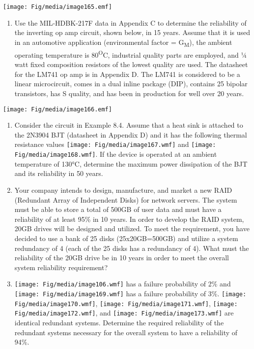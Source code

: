 \texttt{[image: Fig/media/image165.emf]}

\begin{enumerate}
\def\labelenumi{\arabic{enumi}.}
\setcounter{enumi}{7}
\item
  Use the MIL-HDBK-217F data in Appendix C to determine the reliability
  of the inverting op amp circuit, shown below, in 15 years. Assume that
  it is used in an automotive application (environmental factor =
  G\textsubscript{M}), the ambient operating temperature is
  80\textsuperscript{O}C, industrial quality parts are employed, and ¼
  watt fixed composition resistors of the lowest quality are used. The
  datasheet for the LM741 op amp is in Appendix D. The LM741 is
  considered to be a linear microcircuit, comes in a dual inline package
  (DIP), contains 25 bipolar transistors, has S quality, and has been in
  production for well over 20 years.
\end{enumerate}

\texttt{[image: Fig/media/image166.emf]}

\begin{enumerate}
\def\labelenumi{\arabic{enumi}.}
\setcounter{enumi}{8}
\item
  Consider the circuit in Example 8.4. Assume that a heat sink is
  attached to the 2N3904 BJT (datasheet in Appendix D) and it has the
  following thermal resistance values
  \texttt{[image: Fig/media/image167.wmf]} and
  \texttt{[image: Fig/media/image168.wmf]}. If the device is operated at
  an ambient temperature of 130°C, determine the maximum power
  dissipation of the BJT and its reliability in 50 years.
\item
  Your company intends to design, manufacture, and market a new RAID
  (Redundant Array of Independent Disks) for network servers. The system
  must be able to store a total of 500GB of user data and must have a
  reliability of at least 95\% in 10 years. In order to develop the RAID
  system, 20GB drives will be designed and utilized. To meet the
  requirement, you have decided to use a bank of 25 disks
  (25x20GB=500GB) and utilize a system redundancy of 4 (each of the 25
  disks has a redundancy of 4). What must the reliability of the 20GB
  drive be in 10 years in order to meet the overall system reliability
  requirement?
\item
  \texttt{[image: Fig/media/image106.wmf]} has a failure probability of
  2\% and \texttt{[image: Fig/media/image169.wmf]} has a failure
  probability of 3\%. \texttt{[image: Fig/media/image170.wmf]},
  \texttt{[image: Fig/media/image171.wmf]},
  \texttt{[image: Fig/media/image172.wmf]}, and
  \texttt{[image: Fig/media/image173.wmf]} are identical redundant
  systems. Determine the required reliability of the redundant systems
  necessary for the overall system to have a reliability of 94\%.
\end{enumerate}

